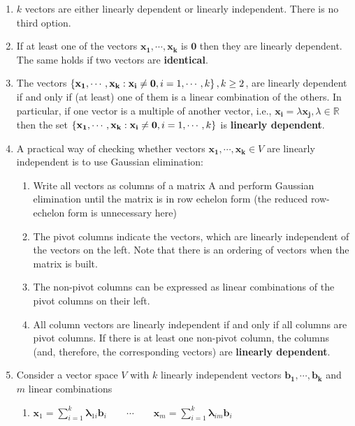 \begin{enumerate}[itemsep=0.2cm]
    \item $k$ vectors are either linearly dependent or linearly independent. There is no third option.

    \item If at least one of the vectors $\mathbf{x_1, \cdots, x_k}$ is $\mathbf{0}$ then they are linearly dependent. The same holds if two vectors are \textbf{identical}.

    \item The vectors $\left\{\mathbf{x_1, \cdots, x_k} : \mathbf{x_i} \neq \mathbf{0}, i = 1, \cdots, k\right\}, k \geq 2$, are linearly dependent if and only if (at least) one of them is a linear combination of the others. In particular, if one vector is a multiple of another vector, i.e., $\mathbf{x_i} = \lambda\mathbf{x_j} , \lambda \in \mathbb{R}$ then the set $\left\{\mathbf{x_1, \cdots, x_k} : \mathbf{x_i} \neq \mathbf{0}, i = 1, \cdots, k\right\}$ is \textbf{linearly dependent}.

    \item A practical way of checking whether vectors $\mathbf{x_1, \cdots, x_k} \in V$ are linearly independent is to use Gaussian elimination: 
    \begin{enumerate}
        \item Write all vectors as columns of a matrix A and perform Gaussian elimination until the matrix is in row echelon form (the reduced row-echelon form is unnecessary here)
        
        \item The pivot columns indicate the vectors, which are linearly independent of the vectors on the left. Note that there is an ordering of vectors when the matrix is built.

        \item The non-pivot columns can be expressed as linear combinations of the pivot columns on their left.

        \item All column vectors are linearly independent if and only if all columns are pivot columns. If there is at least one non-pivot column, the columns (and, therefore, the corresponding vectors) are \textbf{linearly dependent}.
    \end{enumerate}

    \item Consider a vector space $V$ with $k$ linearly independent vectors $\mathbf{b_1, \cdots, b_k}$ and $m$ linear combinations
    \begin{enumerate}
        \item \( \displaystyle \mathbf{x}_1  = \sum_{i=1}^{k} \bm{\lambda}_{1i} \mathbf{b}_i  \quad\quad\cdots\quad\quad \mathbf{x}_m = \sum_{i=1}^{k} \bm{\lambda}_{im} \mathbf{b}_i \)


\end{enumerate}
\end{enumerate}
